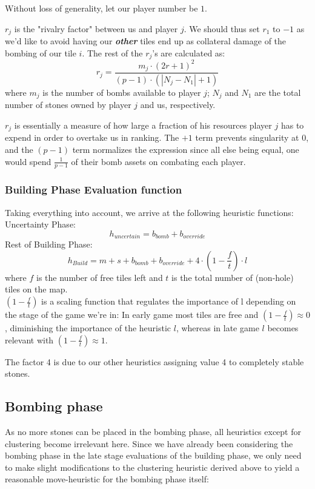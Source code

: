 \documentclass[a4paper,12pt]{article}
\begin{document}
Without loss of generality, let our player number be $1$.

$r_j$ is the "rivalry factor" between us and player $j$. We should thus set $r_1$ to $-1$ as we'd like to avoid having our \textbf{\textit{other}} tiles end up as collateral damage of the bombing of our tile $i$. The rest of the $r_j$'s are calculated as:
\[r_j = \frac{m_j \cdot (2r+1)^2}{(p-1) \cdot (|N_j - N_1| + 1)} \]
where $m_j$ is the number of bombs available to player $j$; $N_j$ and $N_1$ are the total number of stones owned by player $j$ and us, respectively.

$r_j$ is essentially a measure of how large a fraction of his resources player $j$ has to expend in order to overtake us in ranking. The $+1$ term prevents singularity at $0$, and the $(p-1)$ term normalizes the expression since all else being equal, one would spend $\frac{1}{p-1}$ of their bomb assets on combating each player.


\subsubsection{Building Phase Evaluation function}
Taking everything into account, we arrive at the following heuristic functions:\\
Uncertainty Phase:
\[h_{uncertain} = b_{bomb} + b_{override} \]
Rest of Building Phase:
\[ h_{Build} = m + s + b_{bomb} + b_{override} + 4 \cdot (1-\frac{f}{t}) \cdot l \]
where $f$ is the number of free tiles left and $t$ is the total number of (non-hole) tiles on the map.
\\
$(1-\frac{f}{t})$ is a scaling function that regulates the importance of l depending on the stage of the game we're in: In early game most tiles are free and $(1-\frac{f}{t}) \approx 0$, diminishing the importance of the heuristic $l$, whereas in late game $l$ becomes relevant with $(1-\frac{f}{t}) \approx 1$.

The factor 4 is due to our other heuristics assigning value 4 to completely stable stones.


\subsection{Bombing phase}
As no more stones can be placed in the bombing phase, all heuristics except for clustering become irrelevant here. Since we have already been considering the bombing phase in the late stage evaluations of the building phase, we only need to make slight modifications to the clustering heuristic derived above to yield a reasonable move-heuristic for the bombing phase itself:
\end{document}
